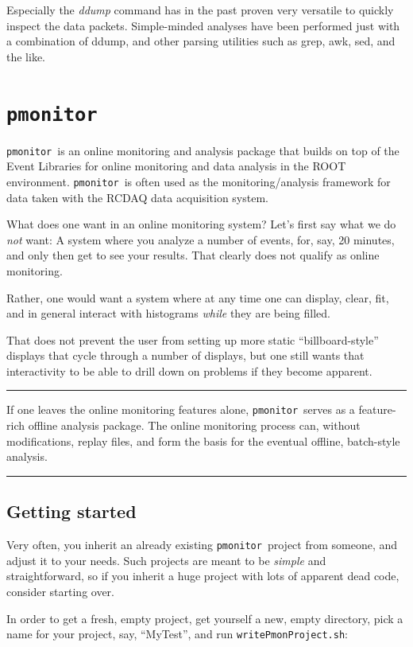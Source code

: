 \documentclass{article}[11pt]
\newcommand{\pmonitor}{{\tt pmonitor}}
\newcommand{\pointout}[1]{
\vskip 3mm
\begin{minipage}[c]{\linewidth}
\hrule
\vskip 2mm
\begin{minipage}[c]{0.1\linewidth}
{\Huge\color{red}\ding{43}}
\end{minipage}
\begin{minipage}[c]{0.9\linewidth}
#1
\end{minipage}
\vskip 2mm
\hrule
\end{minipage}
\vskip 3mm
}
\begin{document}
Especially the \emph{ddump} command has in the past proven very
versatile to quickly inspect the data packets. Simple-minded analyses
have been performed just with a combination of ddump, and other
parsing utilities such as grep, awk, sed, and the like.




\section{\pmonitor}

\pmonitor\ is an online monitoring and analysis package that builds on
top of the Event Libraries for online monitoring and data analysis in
the ROOT environment. \pmonitor\ is often used as the
monitoring/analysis framework for data taken with the RCDAQ data
acquisition system. 

What does one want in an online monitoring system? Let's first say
what we do \emph{not} want: A system where you analyze a number of
events, for, say, 20 minutes, and only then get to see your
results. That clearly does not qualify as online monitoring.

Rather, one would want a system where at any time one can display,
clear, fit, and in general interact with histograms \emph{while} they
are being filled.

That does not prevent the user from setting up more static
``billboard-style'' displays that cycle through a number of displays,
but one still wants that interactivity to be able to drill down on
problems if they become apparent.

\pointout{If one leaves the online monitoring features alone,
  \pmonitor\  serves as a feature-rich off\/line analysis package. The
  online monitoring process can, without modifications, replay files,
  and form the basis for the eventual off\/line, batch-style analysis.
}

\subsection{Getting started}

Very often, you inherit an already existing \pmonitor\ project from
someone, and adjust it to your needs. Such projects are meant to be
\emph{simple} and straightforward, so if you inherit a huge project
with lots of apparent dead code, consider starting over.

In order to get a fresh, empty project, get yourself a new, empty
directory, pick a name for your project, say, ``MyTest'', and run
\verb|writePmonProject.sh|:
\end{document}
